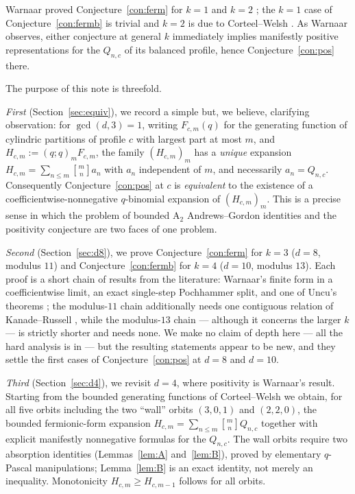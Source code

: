 \documentclass[11pt]{article}
\newcommand{\qbin}[2]{\genfrac{[}{]}{0pt}{}{#1}{#2}}
\newcommand{\poch}[1]{(q;q)_{#1}}
\begin{document}
Warnaar proved Conjecture~\ref{con:ferm} for $k=1$ and $k=2$
\cite[Theorem~2.6]{W23}; the $k=1$ case of Conjecture~\ref{con:fermb} is
trivial and $k=2$ is due to Corteel--Welsh \cite[Theorem~3.2]{CW19}. As
Warnaar observes, either conjecture at general $k$ immediately implies
manifestly positive representations for the $Q_{n,c}$ of its balanced
profile, hence Conjecture~\ref{con:pos} there.

The purpose of this note is threefold.

\emph{First} (Section~\ref{sec:equiv}), we record a simple but, we
believe, clarifying observation: for $\gcd(d,3)=1$, writing
$F_{c,m}(q)$ for the generating function of
cylindric partitions of profile $c$ with largest part at most $m$, and
$H_{c,m}:=\poch{m}F_{c,m}$, the family $(H_{c,m})_m$ has a
\emph{unique} expansion $H_{c,m}=\sum_{n\le m}\qbin{m}{n}a_n$ with
$a_n$ independent of $m$, and necessarily $a_n=Q_{n,c}$. Consequently
Conjecture~\ref{con:pos} at $c$ is \emph{equivalent} to the existence of a
coefficientwise-nonnegative $q$-binomial expansion of $(H_{c,m})_m$. This
is a precise sense in which the problem of bounded $\mathrm{A}_2$
Andrews--Gordon identities and the positivity conjecture are two faces of
one problem.

\emph{Second} (Section~\ref{sec:d8}), we prove
Conjecture~\ref{con:ferm} for $k=3$ ($d=8$, modulus $11$) and
Conjecture~\ref{con:fermb} for $k=4$ ($d=10$, modulus $13$). Each proof
is a short chain of results from the literature: Warnaar's finite form
\cite[Proposition~7.1]{W23} in a coefficientwise limit, an exact
single-step Pochhammer split, and one of Uncu's theorems
\cite[Theorems~4.3 and~5.3]{Uncu23}; the modulus-$11$ chain additionally
needs one contiguous relation of Kanade--Russell \cite[Lemma~9.2]{KR22},
while the modulus-$13$ chain --- although it concerns the larger $k$ ---
is strictly shorter and needs none. We make no claim of depth here ---
all the hard analysis is in \cite{W23,KR22,Uncu23} --- but the resulting
statements appear to be new, and they settle the first cases of
Conjecture~\ref{con:pos} at $d=8$ and $d=10$.

\emph{Third} (Section~\ref{sec:d4}), we revisit $d=4$, where positivity is
Warnaar's result. Starting from the bounded generating functions of
Corteel--Welsh \cite[Theorem~1.2]{CW19} we obtain, for all five orbits
including the two ``wall'' orbits $(3,0,1)$ and $(2,2,0)$, the bounded
fermionic-form expansion $H_{c,m}=\sum_{n\le m}\qbin{m}{n}Q_{n,c}$
together with explicit manifestly nonnegative formulas for the $Q_{n,c}$.
The wall orbits require two absorption identities
(Lemmas~\ref{lem:A} and~\ref{lem:B}), proved by elementary $q$-Pascal
manipulations; Lemma~\ref{lem:B} is an exact identity, not merely an
inequality. Monotonicity $H_{c,m}\ge H_{c,m-1}$ follows for all orbits.
\end{document}
